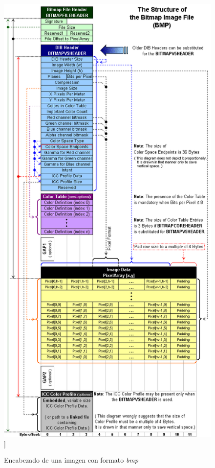\begin{figure}[H]
	\centering
	\includegraphics[scale=0.5]{imagenes/BMPfileFormat.png}]
	\caption{Encabezado de una imagen con formato \textit{bmp}	\label{fig:formato}}
\end{figure}


